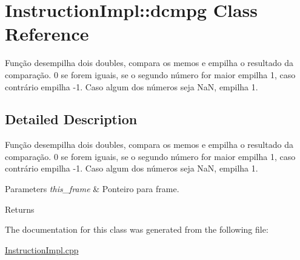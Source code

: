 \hypertarget{class_instruction_impl_1_1dcmpg}{}\section{Instruction\+Impl\+:\+:dcmpg Class Reference}
\label{class_instruction_impl_1_1dcmpg}


Função desempilha dois doubles, compara os memos e empilha o resultado da comparação. 0 se forem iguais, se o segundo número for maior empilha 1, caso contrário empilha -\/1. Caso algum dos números seja NaN, empilha 1.  




\subsection{Detailed Description}
Função desempilha dois doubles, compara os memos e empilha o resultado da comparação. 0 se forem iguais, se o segundo número for maior empilha 1, caso contrário empilha -\/1. Caso algum dos números seja NaN, empilha 1. 


\begin{DoxyParams}{Parameters}
{\em this\+\_\+frame} & Ponteiro para frame. \\
\hline
\end{DoxyParams}
\begin{DoxyReturn}{Returns}

\end{DoxyReturn}


The documentation for this class was generated from the following file\+:\begin{DoxyCompactItemize}
\item 
\hyperlink{_instruction_impl_8cpp}{Instruction\+Impl.\+cpp}\end{DoxyCompactItemize}
